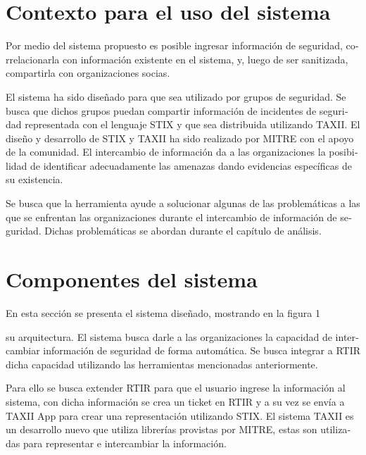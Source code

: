 \documentclass[11pt]{article}
\begin{document}
\section[Contexto para el uso del sistema\ \ ]{\foreignlanguage{spanish}{Contexto para el uso del sistema\ \ }}
\foreignlanguage{spanish}{Por medio del sistema propuesto es posible ingresar información de seguridad, correlacionarla
con información existente en el sistema, y, luego de ser sanitizada, compartirla con organizaciones socias.}


\bigskip

\foreignlanguage{spanish}{El sistema ha sido diseñado para que sea utilizado por grupos de seguridad. Se busca que
dichos grupos puedan compartir información de incidentes de seguridad representada con el lenguaje STIX y que sea
distribuida utilizando TAXII. El diseño y desarrollo de STIX y TAXII ha sido realizado por MITRE con el apoyo de la
comunidad. El intercambio de información da a las organizaciones la posibilidad de identificar adecuadamente las
amenazas dando evidencias específicas de su existencia.}


\bigskip

\foreignlanguage{spanish}{Se busca que la herramienta ayude a solucionar algunas de las problemáticas a las que se
enfrentan las organizaciones durante el intercambio de información de seguridad. Dichas problemáticas se abordan
durante el capítulo de análisis.}

\section[Componentes del sistema]{\foreignlanguage{spanish}{Componentes del sistema}}

\bigskip

\foreignlanguage{spanish}{En esta sección se presenta el sistema diseñado, mostrando en la figura 1 }

\foreignlanguage{spanish}{su arquitectura. El sistema busca darle a las organizaciones la capacidad de intercambiar
información de seguridad de forma automática. Se busca integrar a RTIR dicha capacidad utilizando las herramientas
mencionadas anteriormente. }

\foreignlanguage{spanish}{Para ello se busca extender RTIR para que el usuario ingrese la información al sistema, con
dicha información se crea un ticket en RTIR y a su vez se envía a TAXII App para crear una representación utilizando
STIX. El sistema TAXII es un desarrollo nuevo que utiliza librerías provistas por MITRE, estas son utilizadas para
representar e intercambiar la información.}
\end{document}
